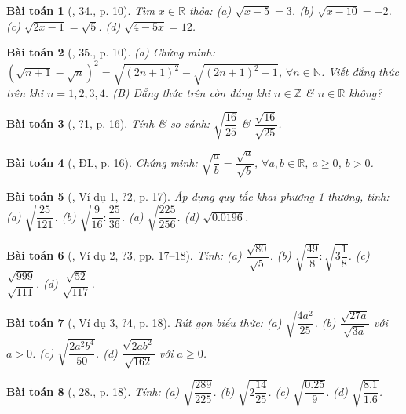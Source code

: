 \documentclass{article}
\newtheorem{baitoan}{Bài toán}
\begin{document}
\begin{baitoan}[\cite{SBT_Toan_9_tap_1}, 34., p. 10]
	Tìm $x\in\mathbb{R}$ thỏa: (a) $\sqrt{x - 5} = 3$. (b) $\sqrt{x - 10} = -2$. (c) $\sqrt{2x - 1} = \sqrt{5}$. (d) $\sqrt{4 - 5x} = 12$.
\end{baitoan}

\begin{baitoan}[\cite{SBT_Toan_9_tap_1}, 35., p. 10]
	(a) Chứng minh: $\left(\sqrt{n + 1} - \sqrt{n}\right)^2 = \sqrt{(2n + 1)^2} - \sqrt{(2n + 1)^2 - 1}$, $\forall n\in\mathbb{N}$. Viết đẳng thức trên khi $n = 1,2,3,4$. (B) Đẳng thức trên còn đúng khi $n\in\mathbb{Z}$ \& $n\in\mathbb{R}$ không?
\end{baitoan}

\begin{baitoan}[\cite{SGK_Toan_9_tap_1}, ?1, p. 16]
	Tính \& so sánh: $\sqrt{\dfrac{16}{25}}$ \& $\dfrac{\sqrt{16}}{\sqrt{25}}$.
\end{baitoan}

\begin{baitoan}[\cite{SGK_Toan_9_tap_1}, ĐL, p. 16]
	Chứng minh: $\sqrt{\dfrac{a}{b}} = \dfrac{\sqrt{a}}{\sqrt{b}}$, $\forall a,b\in\mathbb{R}$, $a\ge0$, $b > 0$.
\end{baitoan}

\begin{baitoan}[\cite{SGK_Toan_9_tap_1}, Ví dụ 1, ?2, p. 17]
	Áp dụng quy tắc khai phương 1 thương, tính: (a) $\sqrt{\dfrac{25}{121}}$. (b) $\sqrt{\dfrac{9}{16}:\dfrac{25}{36}}$. (a) $\sqrt{\dfrac{225}{256}}$. (d) $\sqrt{0.0196}$.
\end{baitoan}

\begin{baitoan}[\cite{SGK_Toan_9_tap_1}, Ví dụ 2, ?3, pp. 17--18]
	Tính: (a) $\dfrac{\sqrt{80}}{\sqrt{5}}$. (b) $\sqrt{\dfrac{49}{8}}:\sqrt{3\dfrac{1}{8}}$. (c) $\dfrac{\sqrt{999}}{\sqrt{111}}$. (d) $\dfrac{\sqrt{52}}{\sqrt{117}}$.
\end{baitoan}

\begin{baitoan}[\cite{SGK_Toan_9_tap_1}, Ví dụ 3, ?4, p. 18]
	Rút gọn biểu thức: (a) $\sqrt{\dfrac{4a^2}{25}}$. (b) $\dfrac{\sqrt{27a}}{\sqrt{3a}}$ với $a > 0$. (c) $\sqrt{\dfrac{2a^2b^4}{50}}$. (d) $\dfrac{\sqrt{2ab^2}}{\sqrt{162}}$ với $a\ge0$.
\end{baitoan}

\begin{baitoan}[\cite{SGK_Toan_9_tap_1}, 28., p. 18]
	Tính: (a) $\sqrt{\dfrac{289}{225}}$. (b) $\sqrt{2\dfrac{14}{25}}$. (c) $\sqrt{\dfrac{0.25}{9}}$. (d) $\sqrt{\dfrac{8.1}{1.6}}$.
\end{baitoan}
\end{document}
